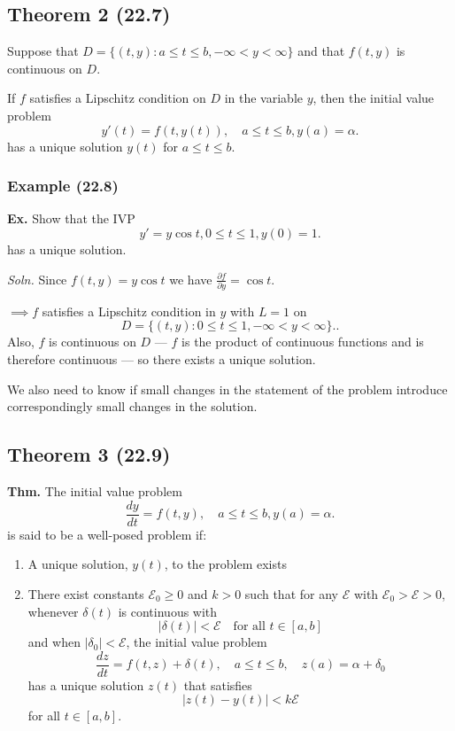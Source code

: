 \documentclass[12pt]{article}
\newcommand{\thm}{\textbf{Thm.}\xspace}
\newcommand{\Ex}{\textbf{Ex.}\xspace}
\newcommand{\bigEps}{\mathcal{E}}
\newcommand{\soln}{\textit{Soln.}\xspace}
\begin{document}
\subsection{Theorem 2 (22.7)}

Suppose that $D=\{(t,y): a\leq t \leq b, -\infty < y < \infty\}$ and that
$f(t,y)$ is continuous on $D$. 

If $f$ satisfies a Lipschitz condition on $D$ in the variable $y$, then the
initial value problem
\[
y'(t) = f(t, y(t)), \quad a \leq t \leq b, y(a) = \alpha
.\]
\noindent
has a unique solution $y(t)$ for $a \leq t \leq b$.

\subsubsection{Example (22.8)}
\noindent
\Ex Show that the IVP 
\[
y' = y\cos t, 0 \leq t \leq 1, y(0) = 1
.\]
\noindent has a unique solution.

\soln Since $f(t,y) = y\cos t$ we have $\frac{\partial f}{\partial y} = \cos t$.

$\implies f$ satisfies a Lipschitz condition in $y$ with $L=1$ on 
\[
D = \{(t,y): 0 \leq t \leq 1, -\infty < y < \infty\}.
.\]
Also, $f$ is continuous on $D$ --- $f$ is the product of continuous functions and
is therefore continuous --- so there exists a unique solution.

We also need to know if small changes in the statement of the problem introduce
correspondingly small changes in the solution.

\subsection{Theorem 3 (22.9)}

\thm The initial value problem
\begin{equation*}
  \frac{dy}{dt} = f(t,y), \quad a \leq t \leq b, y(a) = \alpha
.\end{equation*}
is said to be a well-posed problem if:

\begin{enumerate}
  \item A unique solution, $y(t)$, to the problem exists
  \item There exist constants $\bigEps_0 \geq 0$ and $k > 0$ such that for any $\bigEps$ with $\bigEps_0 > \bigEps > 0$, whenever $\delta(t)$ is continuous with
    \[
      |\delta(t)| < \bigEps \quad \text{for all } t \in [a, b]
    \]
    and when $|\delta_0| < \bigEps$, the initial value problem
    \[
      \frac{dz}{dt} = f(t, z) + \delta(t), \quad a \leq t \leq b, \quad z(a) = \alpha + \delta_0
    \]
    has a unique solution $z(t)$ that satisfies
    \[
      |z(t) - y(t)| < k\bigEps
    \]
    for all $t \in [a, b]$.
\end{enumerate}
\end{document}
